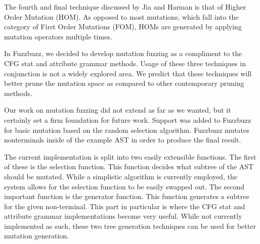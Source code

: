 The fourth and final technique discussed  by Jia and Harman is that of
Higher Order Mutation (HOM). As opposed to most mutations, which fall
into the category of First Order Mutations (FOM), HOMs are generated
by applying mutation operators multiple times.




In Fuzzbuzz, we decided to develop mutation fuzzing as a compliment to
the CFG stat and attribute grammar methods. Usage of these three
techniques in conjunction is not a widely explored area. We predict
that these techniques will better prune the mutation space as compared
to other contemporary pruning methods.



Our work on mutation fuzzing did not extend as far as we wanted, but
it certainly set a firm foundation for future work. Support was added
to Fuzzbuzz for basic mutation based on the random selection
algorithm. Fuzzbuzz mutates nonterminals inside of the example AST in
order to produce the final result.

The current implementation is split into two easily extensible
functions. The first of these is the selection function. This function
decides what subtree of the AST should be mutated. While a simplistic
algorithm is currently employed, the system allows for the selection
function to be easily swapped out. The second important function is
the generator function. This function generates a subtree for the
given non-terminal. This part in particular is where the CFG stat and
attribute grammar implementations become very useful. While not
currently implemented as such, these two tree generation techniques
can be used for better mutation generation.


